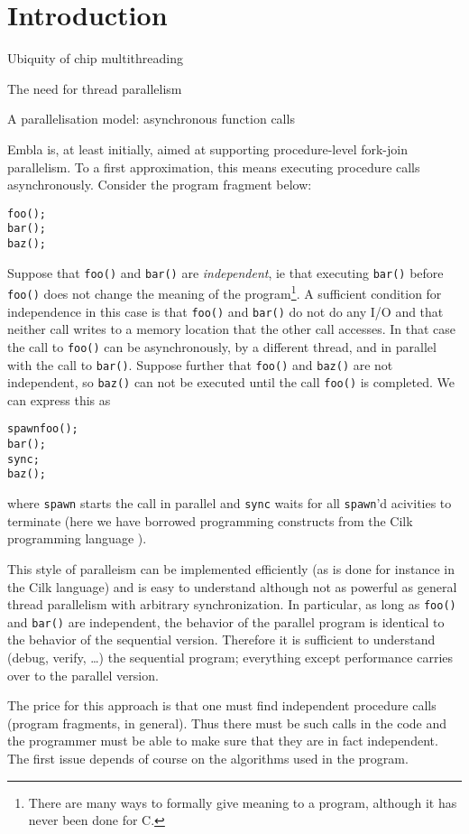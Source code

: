 \section{Introduction}

Ubiquity of chip multithreading

The need for thread parallelism

A parallelisation model: asynchronous function calls


Embla is, at least initially, aimed at supporting procedure-level 
fork-join parallelism. To a first approximation, this means executing 
procedure calls asynchronously. Consider the program fragment below:
\begin{alltt}
   foo();
   bar();
   baz();
\end{alltt}
Suppose that {\tt foo()} and {\tt bar()} are {\em independent}, ie that 
executing {\tt bar()} before {\tt foo()} does not change the meaning of
the program\footnote{There are many ways to formally give meaning to a
program, although it has never been done for C.}. A sufficient condition 
for independence
in this case is that {\tt foo()} and {\tt bar()} do not do any I/O and
that neither call writes to a memory location that the other call 
accesses. In that case the call to {\tt foo()} can be asynchronously, 
by a different thread, and in parallel with the call to {\tt bar()}.
Suppose further that {\tt foo()} and {\tt baz()} are not independent,
so {\tt baz()} can not be executed until the call {\tt foo()} is completed.
We can express this as 
\begin{alltt}
   spawn foo();
   bar();
   sync;
   baz();
\end{alltt}
where {\tt spawn} starts the call in parallel and {\tt sync} waits
for all {\tt spawn}'d acivities to terminate (here we have borrowed 
programming constructs from the Cilk programming language 
\cite{frigo98implementation}).

This style of paralleism can be implemented efficiently (as is done
for instance in the Cilk language) and is easy to understand although
not as powerful as general thread parallelism with arbitrary
synchronization. In particular, as long as {\tt foo()} and {\tt bar()}
are independent, the behavior of the parallel program is identical to
the behavior of the sequential version. Therefore it is sufficient to
understand (debug, verify, \ldots) the sequential program; everything
except performance carries over to the parallel version.

The price for this approach is that one must find independent
procedure calls (program fragments, in general). Thus there must be
such calls in the code and the programmer must be able to make sure
that they are in fact independent. The first issue depends of course
on the algorithms used in the program.

